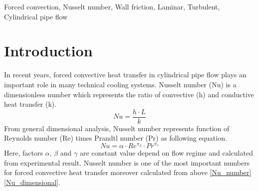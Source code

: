 \documentclass[conference]{IEEEtran}
\begin{document}

\begin{IEEEkeywords}
Forced convection, Nusselt number, Wall friction, Laminar, Turbulent, Cylindrical pipe flow
\end{IEEEkeywords}

\section{Introduction}
In recent years, forced convective heat transfer in cylindrical pipe flow plays an important role in many technical cooling systems.
Nusselt number (Nu) is a dimensionless number which represents the ratio of convective (h) and conductive heat transfer (k).
\begin{equation}
Nu=\frac{h\cdot L}{k}\label{Nu_number}
\end{equation}
From general dimensional analysis, Nusselt number represents function of Reynolds number (Re) times Prandtl number (Pr) as following equation.
\begin{equation}
Nu=\alpha \cdot Re^{\pi_{\beta}}\cdot Pr^{\pi_{\gamma}}\label{Nu_dimensional}
\end{equation}
Here, factors $\alpha$, $\beta$ and $\gamma$ are constant value depend on flow regime and calculated from experimental result.
Nusselt number is one of the most important numbers for forced convective heat transfer moreover calculated from above \eqref{Nu_number}\eqref{Nu_dimensional}.
\end{document}
